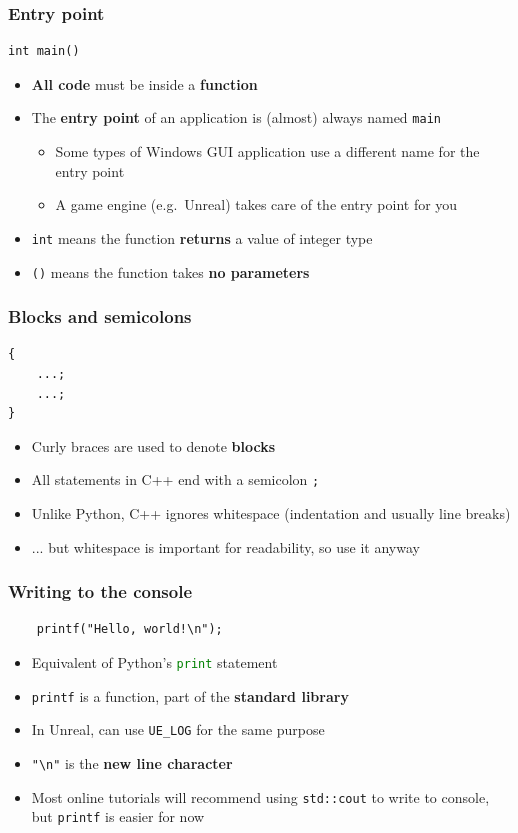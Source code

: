 \begin{frame}[fragile]
	\frametitle{Entry point}
	\begin{lstlisting}
int main()
	\end{lstlisting}
	\pause
	\begin{itemize}
		\item \textbf{All code} must be inside a \textbf{function} \pause
		\item The \textbf{entry point} of an application is (almost) always named \lstinline{main} \pause
		\begin{itemize}
			\item Some types of Windows GUI application use a different name for the entry point \pause
			\item A game engine (e.g.\ Unreal) takes care of the entry point for you \pause
		\end{itemize}
		\item \lstinline{int} means the function \textbf{returns} a value of integer type \pause
		\item \lstinline{()} means the function takes \textbf{no parameters}
	\end{itemize}
\end{frame}

\begin{frame}[fragile]
	\frametitle{Blocks and semicolons}
	\begin{lstlisting}
{
    ...;
    ...;
}
	\end{lstlisting}
	\pause
	\begin{itemize}
		\item Curly braces are used to denote \textbf{blocks} \pause
		\item All statements in C++ end with a semicolon \lstinline{;} \pause
		\item Unlike Python, C++ ignores whitespace (indentation and usually line breaks) \pause
		\item ... but whitespace is important for readability, so use it anyway
	\end{itemize}
\end{frame}

\begin{frame}[fragile]
	\frametitle{Writing to the console}
	\begin{lstlisting}
    printf("Hello, world!\n");
	\end{lstlisting}
	\pause
	\begin{itemize}
		\item Equivalent of Python's \lstinline[language=Python]{print} statement \pause
		\item \lstinline{printf} is a function, part of the \textbf{standard library} \pause
		\item In Unreal, can use \lstinline{UE_LOG} for the same purpose \pause
		\item \lstinline{"\n"} is the \textbf{new line character} \pause
		\item Most online tutorials will recommend using \lstinline{std::cout} to write to console,
			but \lstinline{printf} is easier for now
	\end{itemize}
\end{frame}

